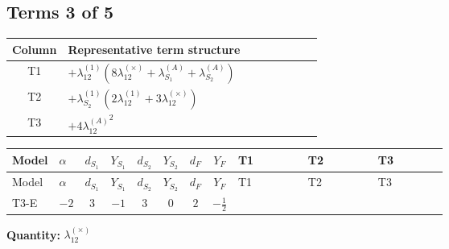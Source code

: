 \documentclass[8pt]{article}
\begin{document}
\begin{landscape}
\subsection*{Terms 3 of 5}
\begin{center}
\begin{tabular}{@{}c >{\raggedright\arraybackslash}p{0.82\linewidth}@{}}
\toprule
Column & Representative term structure \\
\midrule
T1 & \(\displaystyle +{\lambda_{12}^{(1)}} (8 {\lambda_{12}^{(\times)}}+{\lambda_{S_1}^{(A)}}+{\lambda_{S_2}^{(A)}})\) \\
\midrule
T2 & \(\displaystyle +{\lambda_{S_2}^{(1)}} (2 {\lambda_{12}^{(1)}}+3 {\lambda_{12}^{(\times)}})\) \\
\midrule
T3 & \(\displaystyle +4 {\lambda_{12}^{(A)}}^2\) \\
\midrule
\bottomrule
\end{tabular}
\end{center}
\smallskip
\tiny
\begin{longtable}{@{}llcccccc >{\raggedright\arraybackslash}p{0.21\linewidth} >{\raggedright\arraybackslash}p{0.21\linewidth} >{\raggedright\arraybackslash}p{0.21\linewidth}@{}}
\toprule
Model & $\alpha$ & $d_{S_1}$ & $Y_{S_1}$ & $d_{S_2}$ & $Y_{S_2}$ & $d_F$ & $Y_F$ & T1 & T2 & T3 \\
\midrule
\endfirsthead
\toprule
Model & $\alpha$ & $d_{S_1}$ & $Y_{S_1}$ & $d_{S_2}$ & $Y_{S_2}$ & $d_F$ & $Y_F$ & T1 & T2 & T3 \\
\midrule
\endhead
T3-E & $-2$ & $3$ & $-1$ & $3$ & $0$ & $2$ & $-\frac{1}{2}$ & \scriptsize\adjustbox{max width=\linewidth}{$\begin{gathered} +{\lambda_{12}^{(1)}} (8 {\lambda_{12}^{(\times)}}+{\lambda_{S_1}^{(A)}}+{\lambda_{S_2}^{(A)}})\end{gathered}$} & \scriptsize\adjustbox{max width=\linewidth}{$\begin{gathered} +{\lambda_{S_2}^{(1)}} (2 {\lambda_{12}^{(1)}}+3 {\lambda_{12}^{(\times)}})\end{gathered}$} & \scriptsize\adjustbox{max width=\linewidth}{$\begin{gathered} +4 {\lambda_{12}^{(A)}}^2\end{gathered}$} \\
\midrule
\bottomrule
\end{longtable}
\clearpage
\noindent\textbf{Quantity: }$\lambda_{12}^{(\times)}$\par\smallskip

\end{landscape}
\end{document}
